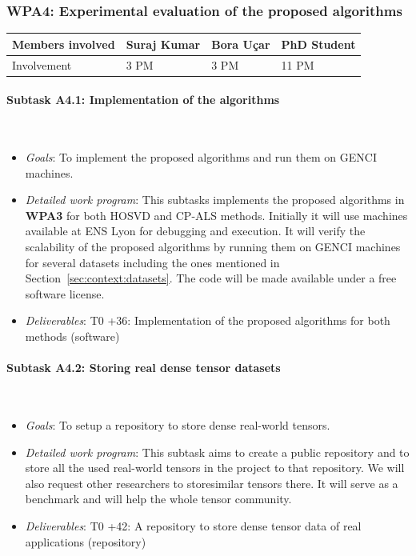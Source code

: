 \documentclass[a4paper,11pt]{article}
\newcommand{\subtask}[1]{{\color{orange}\paragraph{#1}$ $}}
\newcommand{\goal}{{\color{orange2}  \emph{Goals}:} }
\newcommand{\dwp}{{\color{orange2}  \emph{Detailed work program}: }}
\newcommand{\deliverables}{{\color{orange2}  \emph{Deliverables}: }}
\begin{document}
	\vspace*{-0.635cm}\subsubsection{\textbf{WPA4}: Experimental evaluation of the proposed algorithms}
	\vspace*{-0.385cm}\begin{table}[H]
		\begin{tabular}{llll}
			\hline
			\cellcolor{blue2}
			Members involved & Suraj Kumar& Bora Uçar & PhD Student \\
			\hline
			\cellcolor{orange2}
			Involvement      & 3 PM            & 3 PM & 11 PM \\
			\hline
		\end{tabular}
	\end{table}\vspace*{-0.25cm}
	\subtask{Subtask A4.1: Implementation of the algorithms}
	\begin{itemize}[leftmargin=-1pt]
		\item[] \goal To implement the proposed algorithms and run them on GENCI machines.
		\item[] \dwp This subtasks implements the proposed algorithms in \textbf{WPA3} for both HOSVD and CP-ALS methods. Initially it will use machines available at ENS Lyon for debugging and execution. It will verify the scalability of the proposed algorithms by running them on GENCI machines for several datasets including the ones mentioned in Section~\ref{sec:context:datasets}. The code will be made available under a free software license.
		\item[] \deliverables T0 +36: Implementation of the proposed algorithms for both methods (software)	
	\end{itemize}
		\subtask{Subtask A4.2: Storing real dense tensor datasets}
	\begin{itemize}[leftmargin=-1pt]
		\item[] \goal To setup a repository to store dense real-world tensors.
		\item[] \dwp This subtask aims to create a public repository and to store all the used real-world tensors in the project to that repository. We will also request other researchers to store\linebreak similar tensors there. It will serve as a benchmark and will help the whole tensor community.
		\item[] \deliverables T0 +42: A repository to store dense tensor data of real applications (repository)	
	\end{itemize}
\end{document}
